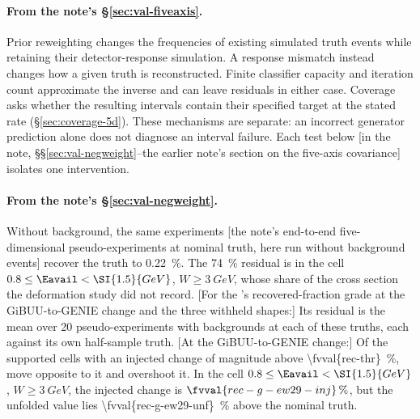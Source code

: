 \paragraph{From the note's \S\ref{sec:val-fiveaxis}.}
Prior reweighting changes the frequencies of existing simulated truth events while retaining their detector-response simulation. A response mismatch instead changes how a given truth is reconstructed. Finite classifier capacity and iteration count approximate the inverse and can leave residuals in either case. Coverage asks whether the resulting intervals contain their specified target at the stated rate (\S\ref{sec:coverage-5d}). These mechanisms are separate: an incorrect generator prediction alone does not diagnose an interval failure. Each test below [in the note, \S\S\ref{sec:val-negweight}--the earlier note's section on the five-axis covariance] isolates one intervention.

\paragraph{From the note's \S\ref{sec:val-negweight}.}
Without background, the same experiments [the note's end-to-end five-dimensional pseudo-experiments at nominal truth, here run without background events] recover the truth to \SI{0.22}{\percent}.
The \SI{74}{\percent} residual is in the cell $0.8\le\Eavail<\SI{1.5}{GeV}$, $W\ge\SI{3}{GeV}$, whose share of the cross section the deformation study did not record.
[For the \estMultiD{}'s recovered-fraction grade at the GiBUU-to-GENIE change and the three withheld shapes:] Its residual is the mean over 20 pseudo-experiments with backgrounds at each of these truths, each against its own half-sample truth. [At the GiBUU-to-GENIE change:] Of the  supported cells with an injected change of magnitude above \SI{\fvval{rec-thr}}{\percent},  move opposite to it and  overshoot it. In the cell $0.8\le\Eavail<\SI{1.5}{GeV}$, $W\ge\SI{3}{GeV}$, the injected change is $\fvval{rec-g-ew29-inj}\,\%$, but the unfolded value lies \SI{\fvval{rec-g-ew29-unf}}{\percent} above the nominal truth.

